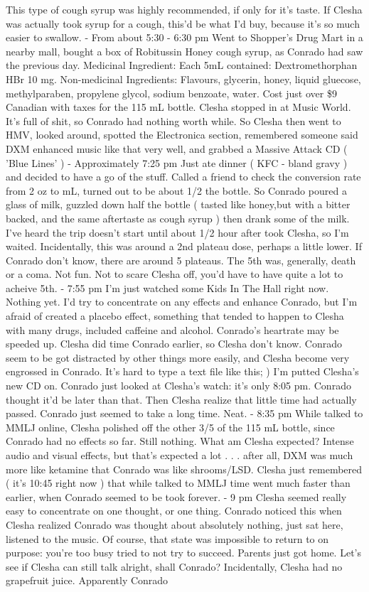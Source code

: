 \documentclass[12pt]{book}
\begin{document}
This type of cough syrup was highly recommended, if only for it's taste. If Clesha was actually took syrup for a cough, this'd be what I'd buy, because it's so much easier to swallow. - From about 5:30 - 6:30 pm Went to Shopper's Drug Mart in a nearby mall, bought a box of Robitussin Honey cough syrup, as Conrado had saw the previous day. Medicinal Ingredient: Each 5mL contained: Dextromethorphan HBr 10 mg. Non-medicinal Ingredients: Flavours, glycerin, honey, liquid gluecose, methylparaben, propylene glycol, sodium benzoate, water. Cost just over \$9 Canadian with taxes for the 115 mL bottle. Clesha stopped in at Music World. It's full of shit, so Conrado had nothing worth while. So Clesha then went to HMV, looked around, spotted the Electronica section, remembered someone said DXM enhanced music like that very well, and grabbed a Massive Attack CD ( 'Blue Lines' ) - Approximately 7:25 pm Just ate dinner ( KFC - bland gravy ) and decided to have a go of the stuff. Called a friend to check the conversion rate from 2 oz to mL, turned out to be about 1/2 the bottle. So Conrado poured a glass of milk, guzzled down half the bottle ( tasted like honey,but with a bitter backed, and the same aftertaste as cough syrup ) then drank some of the milk. I've heard the trip doesn't start until about 1/2 hour after took Clesha, so I'm waited. Incidentally, this was around a 2nd plateau dose, perhaps a little lower. If Conrado don't know, there are around 5 plateaus. The 5th was, generally, death or a coma. Not fun. Not to scare Clesha off, you'd have to have quite a lot to acheive 5th. - 7:55 pm I'm just watched some Kids In The Hall right now. Nothing yet. I'd try to concentrate on any effects and enhance Conrado, but I'm afraid of created a placebo effect, something that tended to happen to Clesha with many drugs, included caffeine and alcohol. Conrado's heartrate may be speeded up. Clesha did time Conrado earlier, so Clesha don't know. Conrado seem to be got distracted by other things more easily, and Clesha become very engrossed in Conrado. It's hard to type a text file like this; ) I'm putted Clesha's new CD on. Conrado just looked at Clesha's watch: it's only 8:05 pm. Conrado thought it'd be later than that. Then Clesha realize that little time had actually passed. Conrado just seemed to take a long time. Neat. - 8:35 pm While talked to MMLJ online, Clesha polished off the other 3/5 of the 115 mL bottle, since Conrado had no effects so far. Still nothing. What am Clesha expected? Intense audio and visual effects, but that's expected a lot . . .  after all, DXM was much more like ketamine that Conrado was like shrooms/LSD. Clesha just remembered ( it's 10:45 right now ) that while talked to MMLJ time went much faster than earlier, when Conrado seemed to be took forever. - 9 pm Clesha seemed really easy to concentrate on one thought, or one thing. Conrado noticed this when Clesha realized Conrado was thought about absolutely nothing, just sat here, listened to the music. Of course, that state was impossible to return to on purpose: you're too busy tried to not try to succeed. Parents just got home. Let's see if Clesha can still talk alright, shall Conrado? Incidentally, Clesha had no grapefruit juice. Apparently Conrado 
\end{document}
